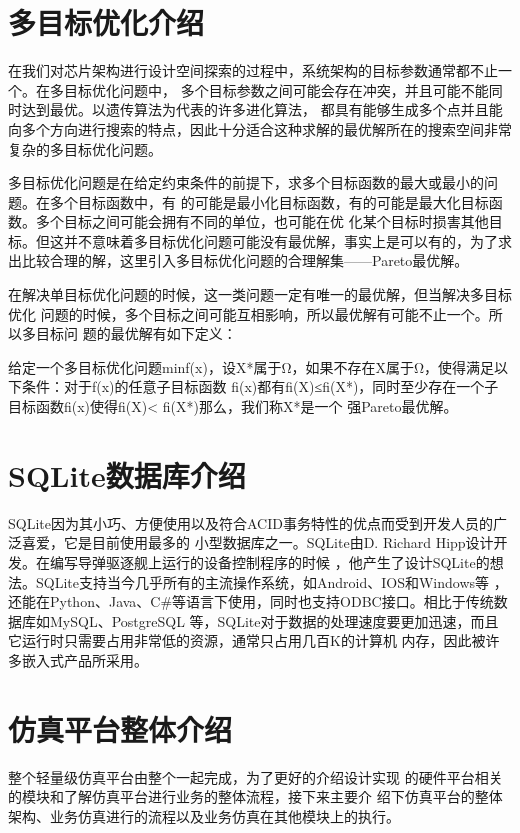   \section{多目标优化介绍}
  在我们对芯片架构进行设计空间探索的过程中，系统架构的目标参数通常都不止一个。在多目标优化问题中，
  多个目标参数之间可能会存在冲突，并且可能不能同时达到最优。以遗传算法为代表的许多进化算法\cite{20}，
  都具有能够生成多个点并且能向多个方向进行搜索的特点，因此十分适合这种求解的最优解所在的搜索空间非常
  复杂的多目标优化问题\cite{21}。

  多目标优化问题是在给定约束条件的前提下，求多个目标函数的最大或最小的问题\cite{22}。在多个目标函数中，有
  的可能是最小化目标函数，有的可能是最大化目标函数。多个目标之间可能会拥有不同的单位，也可能在优
  化某个目标时损害其他目标。但这并不意味着多目标优化问题可能没有最优解，事实上是可以有的，为了求
  出比较合理的解，这里引入多目标优化问题的合理解集——Pareto最优解\cite{23}。

  在解决单目标优化问题的时候，这一类问题一定有唯一的最优解，但当解决多目标优化
  问题的时候，多个目标之间可能互相影响，所以最优解有可能不止一个。所以多目标问
  题的最优解有如下定义：

  给定一个多目标优化问题minf(x)，设X*属于Ω，如果不存在X属于Ω，使得满足以下条件：对于f(x)的任意子目标函数
  fi(x)都有fi(X)≤fi(X*)，同时至少存在一个子目标函数fi(x)使得fi(X)< fi(X*)那么，我们称X*是一个
  强Pareto最优解\cite{24}。

  \section{SQLite数据库介绍}
  SQLite因为其小巧、方便使用以及符合ACID事务特性的优点而受到开发人员的广泛喜爱，它是目前使用最多的
  小型数据库之一\cite{25}。SQLite由D. Richard Hipp设计开发。在编写导弹驱逐舰上运行的设备控制程序的时候
  ，他产生了设计SQLite的想法\cite{26}。SQLite支持当今几乎所有的主流操作系统，如Android、IOS和Windows等
  ，还能在Python、Java、C\#等语言下使用，同时也支持ODBC接口。相比于传统数据库如MySQL、PostgreSQL 
  等，SQLite对于数据的处理速度要更加迅速\cite{27}，而且它运行时只需要占用非常低的资源，通常只占用几百K的计算机
  内存，因此被许多嵌入式产品所采用。

  \section{仿真平台整体介绍}
  整个轻量级仿真平台由整个一起完成，为了更好的介绍设计实现
  的硬件平台相关的模块和了解仿真平台进行业务的整体流程，接下来主要介
  绍下仿真平台的整体架构、业务仿真进行的流程以及业务仿真在其他模块上的执行。

